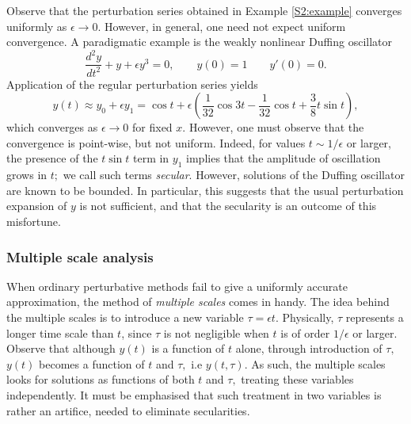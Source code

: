 \documentclass[11pt,reqno,oneside,a4paper]{article}
\begin{document}
Observe that the perturbation series obtained in Example \ref{S2:example} converges uniformly as $\epsilon \to 0.$ However, in general, one need not expect uniform convergence. A paradigmatic example is the weakly nonlinear Duffing oscillator
\begin{equation}\label{Duffing}
\frac{d^2 y}{d t^2} + y + \epsilon y^3 = 0, \qquad y(0)=1 \qquad y'(0)=0.
\end{equation}
Application of the regular perturbation series yields
\begin{equation*}
y(t) \approx y_0 + \epsilon y_1 = \cos t + \epsilon\left(\frac{1}{32} \cos 3t -\frac{1}{32} \cos t + \frac{3}{8} t \sin t\right ),
\end{equation*}
which converges as $\epsilon \to 0$ for fixed $x.$ However, one must observe that the convergence is point-wise, but not uniform. Indeed, for values $t \sim 1/\epsilon$ or larger, the presence of the $t \sin t$ term in $y_1$ implies that the amplitude of oscillation grows in $t;$ we call such terms \textit{secular}. However, solutions of the Duffing oscillator are known to be bounded. In particular, this suggests that the usual perturbation expansion of $y$ is not sufficient, and that the secularity is an outcome of this misfortune.

\subsubsection*{Multiple scale analysis}
When ordinary perturbative methods fail to give a uniformly accurate approximation, the method of \textit{multiple scales} comes in handy. The idea behind the multiple scales is to introduce a new variable $\tau = \epsilon t.$ Physically, $\tau$ represents a longer time scale than $t$, since $\tau$ is not negligible when $t$ is of order $1/\epsilon$ or larger. Observe that although $y(t)$ is a function of $t$ alone, through introduction of $\tau,$ $y(t)$ becomes a function of $t$ and $\tau,$ i.e $y(t, \tau).$ As such, the multiple scales looks for solutions as functions of both $t$ and $\tau,$ treating these variables independently. It must be emphasised that such treatment in two variables is rather an artifice, needed to eliminate secularities.
\end{document}
